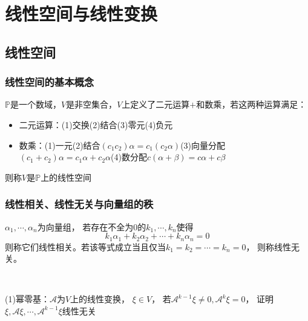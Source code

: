 

\chapter{线性空间与线性变换}

\section{线性空间}

\subsection{线性空间的基本概念}

\begin{definition}[线性空间]
  $\mathbb{P}$是一个数域，$V$是非空集合，$V$上定义了二元运算$+$和数乘，若这两种运算满足：
  \begin{itemize}
  \item 二元运算：(1)交换(2)结合(3)零元(4)负元
  \item 数乘：(1)一元(2)结合$(c_1c_2)\alpha = c_1(c_2 \alpha)$(3)向量分配$(c_1+c_2)\alpha = c_1\alpha + c_2\alpha$(4)数分配$c(\alpha + \beta) = c\alpha + c \beta$
  \end{itemize}
  则称$V$是$\mathbb{P}$上的线性空间
\end{definition}




\subsection{线性相关、线性无关与向量组的秩}

\begin{definition}[线性相关和线性无关]
  $\alpha_1,\cdots,\alpha_n$为向量组，
  若存在不全为$0$的$k_1,\cdots,k_n$使得
  \begin{equation*}
    k_1\alpha_1 + k_2\alpha_2 + \cdots + k_n\alpha_n = 0
  \end{equation*}
  则称它们线性相关。若该等式成立当且仅当$k_1 = k_2 = \cdots = k_n = 0$，
  则称线性无关。
\end{definition}

~

\begin{exercise}[证明线性无关]
  (1)幂零基：$\mathcal{A}$为$V$上的线性变换，
  $\xi \in V$，
  若$\mathcal{A}^{k-1}\xi \neq 0, \mathcal{A}^k \xi = 0$，
  证明$\xi,\mathcal{A}\xi,\cdots,\mathcal{A}^{k-1}\xi$线性无关
\end{exercise}

